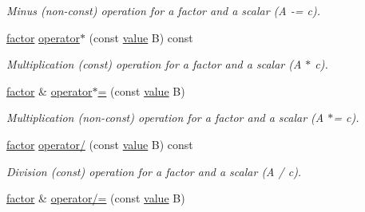 \begin{DoxyCompactItemize}
\begin{DoxyCompactList}\small\item\em Minus (non-\/const) operation for a factor and a scalar (A -\/= c). \end{DoxyCompactList}\item 
\hyperlink{classmerlin_1_1factor}{factor} \hyperlink{classmerlin_1_1factor_a9c20ee42212e6b606bda2f14f73bd607}{operator$\ast$} (const \hyperlink{classmerlin_1_1factor_a1b14d19e509403448fbef26b003c9281}{value} B) const \hypertarget{classmerlin_1_1factor_a9c20ee42212e6b606bda2f14f73bd607}{}\label{classmerlin_1_1factor_a9c20ee42212e6b606bda2f14f73bd607}

\begin{DoxyCompactList}\small\item\em Multiplication (const) operation for a factor and a scalar (A $\ast$ c). \end{DoxyCompactList}\item 
\hyperlink{classmerlin_1_1factor}{factor} \& \hyperlink{classmerlin_1_1factor_ae4ff5bee072a9969531828a515563597}{operator$\ast$=} (const \hyperlink{classmerlin_1_1factor_a1b14d19e509403448fbef26b003c9281}{value} B)\hypertarget{classmerlin_1_1factor_ae4ff5bee072a9969531828a515563597}{}\label{classmerlin_1_1factor_ae4ff5bee072a9969531828a515563597}

\begin{DoxyCompactList}\small\item\em Multiplication (non-\/const) operation for a factor and a scalar (A $\ast$= c). \end{DoxyCompactList}\item 
\hyperlink{classmerlin_1_1factor}{factor} \hyperlink{classmerlin_1_1factor_a9c3a4833e8505430666ff742ef5f1e26}{operator/} (const \hyperlink{classmerlin_1_1factor_a1b14d19e509403448fbef26b003c9281}{value} B) const \hypertarget{classmerlin_1_1factor_a9c3a4833e8505430666ff742ef5f1e26}{}\label{classmerlin_1_1factor_a9c3a4833e8505430666ff742ef5f1e26}

\begin{DoxyCompactList}\small\item\em Division (const) operation for a factor and a scalar (A / c). \end{DoxyCompactList}\item 
\hyperlink{classmerlin_1_1factor}{factor} \& \hyperlink{classmerlin_1_1factor_a7a9e85476966fa9efc6a6fd38dba6670}{operator/=} (const \hyperlink{classmerlin_1_1factor_a1b14d19e509403448fbef26b003c9281}{value} B)\hypertarget{classmerlin_1_1factor_a7a9e85476966fa9efc6a6fd38dba6670}{}\label{classmerlin_1_1factor_a7a9e85476966fa9efc6a6fd38dba6670}


\end{DoxyCompactItemize}
